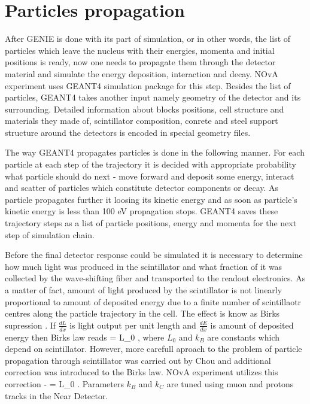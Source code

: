 \section{Particles propagation}
After GENIE is done with its part of simulation, or in other words, the list of particles which leave 
the nucleus with their energies, momenta and initial positions is ready, now one needs to propagate them
through the detector material and simulate the energy deposition, interaction and decay. NOvA experiment
uses GEANT4 \cite{GEANT4} simulation package for this step. Besides the list of particles, GEANT4 takes
another input namely geometry of the detector and its surrounding. Detailed information about blocks 
positions, cell structure and materials they made of, scintillator composition, conrete and steel support
structure around the detectors is encoded in special geometry files.

The way GEANT4 propagates particles is done in the following manner. For each particle at each step of the 
trajectory it is decided with appropriate probability what particle should do next - move forward and deposit 
some energy, interact and scatter of particles which constitute detector components or decay. As particle
propagates further it loosing its kinetic energy and as soon as particle's kinetic energy is less than 100 eV
propagation stops. GEANT4 saves these trajectory steps as a list of particle positions, energy and momenta 
for the next step of simulation chain. 

Before the final detector response could be simulated it is necessary to determine how much light was produced
in the scintillator and what fraction of it was collected by the wave-shifting fiber and transported to the 
readout electronics. As a matter of fact, amount of light produced by the scintillator is not linearly 
proportional to amount of deposited energy due to a finite number of scintillaotr centres along the particle
trajectory in the cell. The effect is know as Birks supression \cite{birks}. If $\frac{dL}{dx}$ is light 
output per unit length and $\frac{dE}{dx}$ is amount of deposited energy then Birks law reads
\be
{} = L_0 , 
\ee
where $L_0$ and $k_B$ are constants which depend on scintillator. However, more carefull aproach to the problem
of particle propagation through scintillator was carried out by Chou \cite{chou} and additional correction was
introduced to the Birks law. NOvA experiment utilizes this correction - 
\be
{} = L_0 .
\ee
Parameters $k_B$ and $k_C$ are tuned using muon and protons tracks in the Near Detector.

